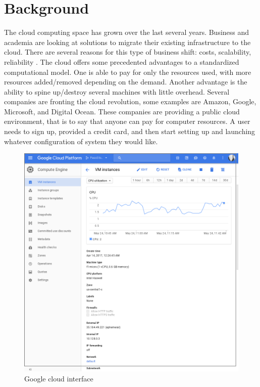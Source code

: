 \documentclass[12pt]{article}
\begin{document}
\section{Background}
The cloud computing space has grown over the last several years. Business and academia are looking at solutions to migrate their existing infrastructure to the cloud. There are several reasons for this type of business shift: costs, scalability, reliability \cite{DillonWuChang}. The cloud offers some precedented advantages to a standardized computational model. One is able to pay for only the resources used, with more resources added/removed depending on the demand. Another advantage is the ability to spine up/destroy several machines with little overhead. Several companies are fronting the cloud revolution, some examples are Amazon\cite{amazonaws2017}, Google\cite{GoogleCloudCompute2017}, Microsoft\cite{Azure2017}, and Digital Ocean\cite{DigitalOcian2017}. These companies are providing a public cloud environment, that is to say that anyone can pay for computer resources. A user needs to sign up, provided a credit card, and then start setting up and launching whatever configuration of system they would like.

\begin{figure}
    \includegraphics[scale=.2]{./pic/2017-05-24-114324_946x962_scrot.png}
    \caption{Google cloud interface}
\end{figure}
\end{document}
